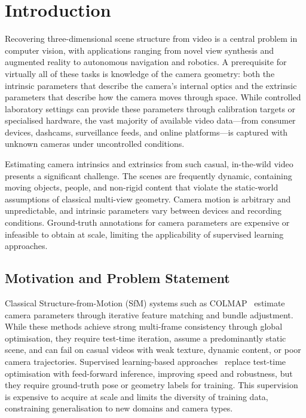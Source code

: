 
\chapter{Introduction}\label{chapter:introduction}

Recovering three-dimensional scene structure from video is a central problem in computer vision, with applications ranging from novel view synthesis and augmented reality to autonomous navigation and robotics. A prerequisite for virtually all of these tasks is knowledge of the camera geometry: both the intrinsic parameters that describe the camera's internal optics and the extrinsic parameters that describe how the camera moves through space. While controlled laboratory settings can provide these parameters through calibration targets or specialised hardware, the vast majority of available video data---from consumer devices, dashcams, surveillance feeds, and online platforms---is captured with unknown cameras under uncontrolled conditions.

Estimating camera intrinsics and extrinsics from such casual, in-the-wild video presents a significant challenge. The scenes are frequently dynamic, containing moving objects, people, and non-rigid content that violate the static-world assumptions of classical multi-view geometry. Camera motion is arbitrary and unpredictable, and intrinsic parameters vary between devices and recording conditions. Ground-truth annotations for camera parameters are expensive or infeasible to obtain at scale, limiting the applicability of supervised learning approaches.

\section{Motivation and Problem Statement}\label{sec:motivation}

Classical Structure-from-Motion (SfM) systems such as COLMAP~\parencite{schonberger2016structure} estimate camera parameters through iterative feature matching and bundle adjustment. While these methods achieve strong multi-frame consistency through global optimisation, they require test-time iteration, assume a predominantly static scene, and can fail on casual videos with weak texture, dynamic content, or poor camera trajectories. Supervised learning-based approaches~\parencite{wang2024dust3r,yugay2025vot,lin2025depth} replace test-time optimisation with feed-forward inference, improving speed and robustness, but they require ground-truth pose or geometry labels for training. This supervision is expensive to acquire at scale and limits the diversity of training data, constraining generalisation to new domains and camera types.

